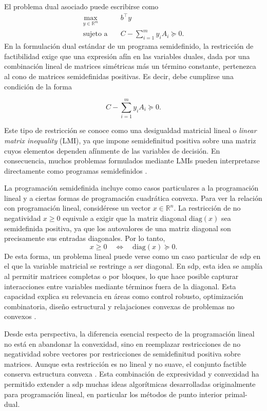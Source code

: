 El problema dual asociado puede escribirse como
\[
\begin{aligned}
    \max_{y\in\mathbb{R}^m}\quad & b^\top y \\
    \text{sujeto a}\quad & C-\sum_{i=1}^{m} y_i A_i \succeq 0.
\end{aligned}
\]
En la formulación dual estándar de un programa semidefinido, la restricción de factibilidad
exige que una expresión afín en las variables duales, dada por una combinación lineal de matrices
simétricas más un término constante, pertenezca al cono de matrices semidefinidas positivas.
Es decir, debe cumplirse una condición de la forma

\[
C - \sum_{i=1}^{m} y_i A_i \succeq 0.
\]

Este tipo de restricción se conoce como una desigualdad matricial lineal o
\textit{linear matrix inequality} (LMI), ya que impone semidefinitud positiva sobre una matriz
cuyos elementos dependen afínmente de las variables de decisión. En consecuencia,
muchos problemas formulados mediante LMIs pueden interpretarse directamente como programas
semidefinidos \cite{vandenbergheSemidefiniteProgramming1996,boydLinearMatrixInequalities1994}.


La programación semidefinida incluye como casos particulares a la programación lineal y a
ciertas formas de programación cuadrática convexa. Para ver la relación con programación
lineal, considérese un vector $x\in\mathbb{R}^n$. La restricción de no negatividad
$x\geq 0$ equivale a exigir que la matriz diagonal $\mathrm{diag}(x)$ sea semidefinida
positiva, ya que los autovalores de una matriz diagonal son precisamente sus entradas
diagonales. Por lo tanto,
\[
    x\geq 0 \quad \Longleftrightarrow \quad \mathrm{diag}(x)\succeq 0.
\]
De esta forma, un problema lineal puede verse como un caso particular de \acrshort{sdp}
en el que la variable matricial se restringe a ser diagonal. En \acrshort{sdp}, esta idea
se amplía al permitir matrices completas o por bloques, lo que hace posible capturar
interacciones entre variables mediante términos fuera de la diagonal. Esta capacidad
explica su relevancia en áreas como control robusto, optimización combinatoria, diseño
estructural y relajaciones convexas de problemas no convexos
\cite{vandenbergheSemidefiniteProgramming1996,faresROBUSTCONTROLSEQUENTIAL2002,borchersSDPLIB12Library1999}.

Desde esta perspectiva, la diferencia esencial respecto de la programación lineal no está
en abandonar la convexidad, sino en reemplazar restricciones de no negatividad sobre
vectores por restricciones de semidefinitud positiva sobre matrices. Aunque esta restricción
es no lineal y no suave, el conjunto factible conserva estructura convexa
\cite{vandenbergheSemidefiniteProgramming1996}. Esta combinación de expresividad y
convexidad ha permitido extender a \acrshort{sdp} muchas ideas algorítmicas desarrolladas
originalmente para programación lineal, en particular los métodos de punto interior
primal-dual.

